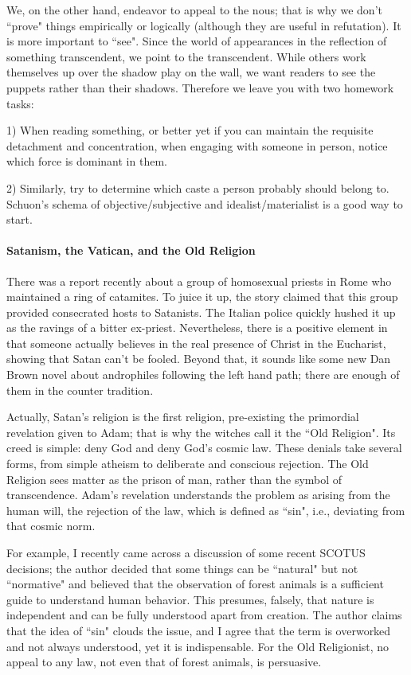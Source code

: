 We, on the other hand, endeavor to appeal to the nous; that is why we don't ``prove" things empirically or logically (although they are useful in refutation). It is more important to ``see". Since the world of appearances in the reflection of something transcendent, we point to the transcendent. While others work themselves up over the shadow play on the wall, we want readers to see the puppets rather than their shadows. Therefore we leave you with two homework tasks:

1) When reading something, or better yet if you can maintain the requisite detachment and concentration, when engaging with someone in person, notice which force is dominant in them.

2) Similarly, try to determine which caste a person probably should belong to. Schuon's schema of objective/subjective and idealist/materialist is a good way to start.

\paragraph{Satanism, the Vatican, and the Old Religion}
There was a report recently about a group of homosexual priests in Rome who maintained a ring of catamites. To juice it up, the story claimed that this group provided consecrated hosts to Satanists. The Italian police quickly hushed it up as the ravings of a bitter ex-priest. Nevertheless, there is a positive element in that someone actually believes in the real presence of Christ in the Eucharist, showing that Satan can't be fooled. Beyond that, it sounds like some new Dan Brown novel about androphiles following the left hand path; there are enough of them in the counter tradition.

Actually, Satan's religion is the first religion, pre-existing the primordial revelation given to Adam; that is why the witches call it the ``Old Religion". Its creed is simple: deny God and deny God's cosmic law. These denials take several forms, from simple atheism to deliberate and conscious rejection. The Old Religion sees matter as the prison of man, rather than the symbol of transcendence. Adam's revelation understands the problem as arising from the human will, the rejection of the law, which is defined as ``sin", i.e., deviating from that cosmic norm.

For example, I recently came across a discussion of some recent SCOTUS decisions; the author decided that some things can be ``natural" but not ``normative" and believed that the observation of forest animals is a sufficient guide to understand human behavior. This presumes, falsely, that nature is independent and can be fully understood apart from creation. The author claims that the idea of ``sin" clouds the issue, and I agree that the term is overworked and not always understood, yet it is indispensable. For the Old Religionist, no appeal to any law, not even that of forest animals, is persuasive.

